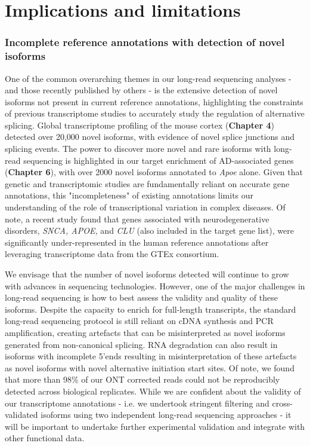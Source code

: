 \section{Implications and limitations}

\subsubsection{Incomplete reference annotations with detection of novel isoforms} 
One of the common overarching themes in our long-read sequencing analyses - and those recently published by others - is the extensive detection of novel isoforms not present in current reference annotations, highlighting the constraints of previous transcriptome studies to accurately study the regulation of alternative splicing. Global transcriptome profiling of the mouse cortex (\textbf{Chapter 4}) detected over 20,000 novel isoforms, with evidence of novel splice junctions and splicing events. The power to discover more novel and rare isoforms with long-read sequencing is highlighted in our target enrichment of AD-associated genes (\textbf{Chapter 6}), with over 2000 novel isoforms annotated to \textit{Apoe} alone. Given that genetic and transcriptomic studies are fundamentally reliant on accurate gene annotations, this "incompleteness" of existing annotations limits our understanding of the role of transcriptional variation in complex diseases. Of note, a recent study found that genes associated with neurodegenerative disorders, \textit{SNCA, APOE,} and \textit{CLU} (also included in the target gene list), were significantly under-represented in the human reference annotations after leveraging transcriptome data from the GTEx consortium\cite{Zhang2020b}.  

We envisage that the number of novel isoforms detected will continue to grow with advances in sequencing technologies. However, one of the major challenges in long-read sequencing is how to best assess the validity and quality of these isoforms. Despite the capacity to enrich for full-length transcripts, the standard long-read sequencing protocol is still reliant on cDNA synthesis and PCR amplification, creating artefacts that can be misinterpreted as novel isoforms generated from non-canonical splicing. RNA degradation can also result in isoforms with incomplete 5'ends resulting in misinterpretation of these artefacts as novel isoforms with novel alternative initiation start sites\cite{Kuo2020}. Of note, we found that more than 98\% of our ONT corrected reads could not be reproducibly detected across biological replicates. While we are confident about the validity of our transcriptome annotations - i.e. we undertook stringent filtering and cross-validated isoforms using two independent long-read sequencing approaches - it will be important to undertake further experimental validation and integrate with other functional data. 


